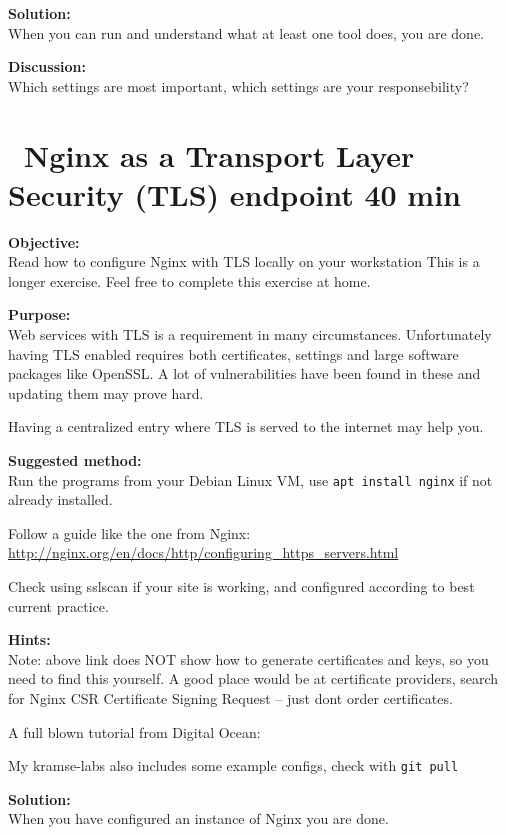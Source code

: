 \documentclass[a4paper,11pt,notitlepage]{report}
\begin{document}
{\bf Solution:}\\
When you can run and understand what at least one tool does, you are done.

{\bf Discussion:}\\
Which settings are most important, which settings are your responsebility?


\chapter{\faInfoCircle\ Nginx as a Transport Layer Security (TLS) endpoint 40 min}
\label{ex:nginx-tls}

{\bf Objective:}\\
Read how to configure Nginx with TLS locally on your workstation
This is a longer exercise. Feel free to complete this exercise at home.

{\bf Purpose:}\\
Web services with TLS is a requirement in many circumstances. Unfortunately having TLS enabled requires both certificates, settings and large software packages like OpenSSL. A lot of vulnerabilities have been found in these and updating them may prove hard.

Having a centralized entry where TLS is served to the internet may help you.

{\bf Suggested method:}\\
Run the programs from your Debian Linux VM, use \verb+apt install nginx+ if not already installed.

Follow a guide like the one from Nginx:\\
\url{http://nginx.org/en/docs/http/configuring_https_servers.html}

Check using sslscan if your site is working, and configured according to best current practice.

{\bf Hints:}\\
Note: above link does NOT show how to generate certificates and keys, so you need to find this yourself. A good place would be at certificate providers, search for Nginx CSR Certificate Signing Request -- just dont order certificates.

A full blown tutorial from Digital Ocean:\\

My kramse-labs also includes some example configs, check with \verb+git pull+

{\bf Solution:}\\
When you have configured an instance of Nginx you are done.
\end{document}
